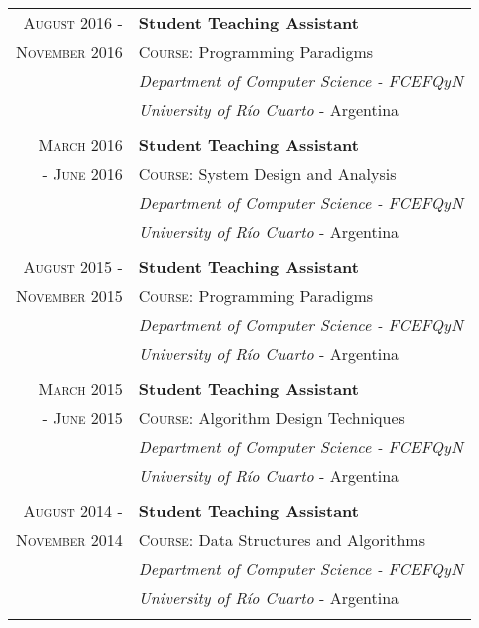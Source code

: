 \documentclass[a4paper,10pt]{article} %
\begin{document}
\begin{longtable}{rl}
\textsc{August 2016 -} & \textbf{Student Teaching Assistant} \\
\textsc{November 2016} & \textsc{Course:} Programming Paradigms \\ & \textit{Department of Computer Science - FCEFQyN} \\  
& \textit{University of Río Cuarto} - Argentina \\ & \\

\textsc{March 2016} & \textbf{Student Teaching Assistant} \\
\textsc{- June 2016} & \textsc{Course:} System Design and Analysis \\ & \textit{Department of Computer Science - FCEFQyN} \\  
& \textit{University of Río Cuarto} - Argentina \\ & \\

\textsc{August 2015 -} & \textbf{Student Teaching Assistant} \\
\textsc{November 2015} & \textsc{Course:} Programming Paradigms \\ & \textit{Department of Computer Science - FCEFQyN} \\  
& \textit{University of Río Cuarto} - Argentina \\ & \\

\textsc{March 2015} & \textbf{Student Teaching Assistant} \\
\textsc{- June 2015} & \textsc{Course:} Algorithm Design Techniques \\ & \textit{Department of Computer Science - FCEFQyN} \\ & \textit{University of Río Cuarto} - Argentina \\ & \\ 

\textsc{August 2014 -} & \textbf{Student Teaching Assistant} \\
\textsc{November 2014} & \textsc{Course:} Data Structures and Algorithms \\ & \textit{Department of Computer Science - FCEFQyN} \\ & \textit{University of Río Cuarto} - Argentina \\ & \\ 

\end{longtable}
\end{document}
